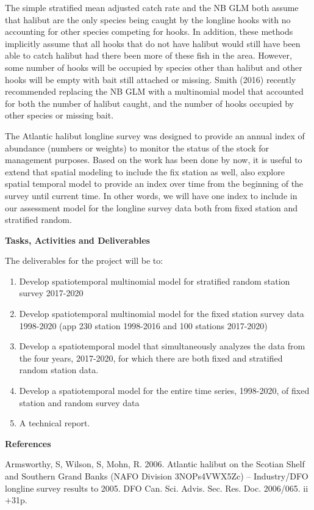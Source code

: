 \documentclass[12pt]{article}\usepackage[]{graphicx}\usepackage[]{color}
\begin{document}
\begin{appendices}
The simple stratified mean adjusted catch rate and the NB GLM both assume that halibut are the only species being caught by the longline hooks with no accounting for other species competing for hooks. In addition, these methods implicitly assume that all hooks that do not have halibut would still have been able to catch halibut had there been more of these fish in the area. However, some number of hooks will be occupied by species other than halibut and other hooks will be empty with bait still attached or missing. Smith (2016) recently recommended replacing the NB GLM with a multinomial model that accounted for both the number of halibut caught, and the number of hooks occupied by other species or missing bait.

The Atlantic halibut longline survey was designed to provide an annual index of abundance (numbers or weights) to monitor the status of the stock for management purposes. Based on the work has been done by now, it is useful to extend that spatial modeling to include the fix station as well, also explore spatial temporal model to provide an index over time from the beginning of the survey until current time. In other words, we will have one index to include in our assessment model for the longline survey data both from fixed station and stratified random.

\textbf{Tasks, Activities and Deliverables}

The deliverables for the project will be to:
\begin{enumerate}
\def\labelenumi{\arabic{enumi})}
\item
  Develop spatiotemporal multinomial model for stratified random station survey 2017-2020
\item
  Develop spatiotemporal multinomial model for the fixed station survey data 1998-2020 (app 230 station 1998-2016 and 100 stations 2017-2020)
\item
  Develop a spatiotemporal model that simultaneously analyzes the data from the four years, 2017-2020, for which there are both fixed and stratified random station data.
\item
  Develop a spatiotemporal model for the entire time series, 1998-2020, of fixed station and random survey data
\item
  A technical report.
\end{enumerate}
\textbf{References}

Armsworthy, S, Wilson, S, Mohn, R. 2006. Atlantic halibut on the Scotian Shelf and Southern Grand Banks (NAFO Division 3NOPs4VWX5Zc) -- Industry/DFO longline survey results to 2005. DFO Can. Sci. Advis. Sec. Res. Doc. 2006/065. ii +31p.


\end{appendices}
\end{document}
